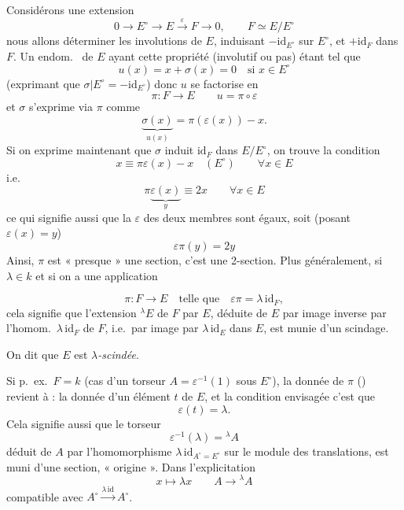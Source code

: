 \documentclass[11pt,a4paper]{article}
\begin{document}
Considérons une extension
\[
  0 \longrightarrow E^{\circ} \longrightarrow E \xrightarrow{\ \varepsilon\ } F \longrightarrow 0,
  \qquad F \simeq E/E^{\circ}
\]
nous allons déterminer les involutions de $E$, induisant $-\mathrm{id}_{E^{\circ}}$ sur $E^{\circ}$, et $+\mathrm{id}_F$ dans $F$. Un endom.\ \add{$\sigma$} de $E$ ayant cette propriété (involutif ou pas) étant tel que
\[
  u(x) = x + \sigma(x) = 0 \quad \text{si } x \in E^{\circ}
\]
(exprimant que $\sigma | E^{\circ} = -\mathrm{id}_{E^{\circ}}$) donc $u$ se factorise en
\[
  \pi : F \longrightarrow E \qquad u = \pi \circ \varepsilon
\]
et  $\sigma$ s'exprime via $\pi$ comme
\[
  \underbrace{\sigma(x)}_{u(x)} = \pi(\varepsilon(x)) - x .
\]
Si on exprime maintenant que $\sigma$ induit $\mathrm{id}_F$ dans $E/E^{\circ}$, on trouve la condition
\[
  x \equiv \pi \varepsilon(x) - x \quad (E^{\circ}) \qquad \forall x \in E
\]
i.e.
\[
  \pi \underbrace{\varepsilon(x)}_{y} \equiv 2x \qquad \forall x \in E
\]
ce qui signifie aussi que la $\varepsilon$ des deux membres sont égaux, soit (posant $\varepsilon(x) = y$)
\[
  \boxed{\varepsilon \pi(y) = 2y}
\]
Ainsi, $\pi$ est « presque » une section, c'est une 2-section.  Plus généralement, si $\lambda \in k$ et si on a une application

\[
  \pi : F \longrightarrow E \quad \text{telle que} \quad \varepsilon \pi = \lambda\, \mathrm{id}_F ,
\]
cela signifie que l'extension ${}^{\lambda}E$ de $F$ par $E$, déduite de $E$ par image inverse par l'homom.\ $\lambda\, \mathrm{id}_F$ de $F$, i.e.\ par image  par $\lambda\, \mathrm{id}_E$ dans $E$, est munie d'un scindage.

On dit que $E$ est \emph{$\lambda$-scindée}.

Si p.~ex.\ $F = k$ (cas d'un torseur $A = \varepsilon^{-1}(1)$ sous $E^{\circ}$), la donnée de $\pi$ () revient à : la donnée d'un élément $t$ de $E$, et la condition envisagée c'est que
\[
  \varepsilon(t) = \lambda .
\]
Cela signifie aussi que le torseur
\[
  \varepsilon^{-1}(\lambda) = {}^{\lambda}A
\]
 déduit de $A$ par l'homomorphisme $\lambda\, \mathrm{id}_{A^{\circ} = E^{\circ}}$ sur le module des translations, est muni d'une section, « origine ». Dans l'explicitation
\[
  x \longmapsto \lambda x \qquad A \longrightarrow {}^{\lambda}A
\]
compatible avec $A^{\circ} \xrightarrow{\lambda\,\mathrm{id}} A^{\circ}$.
\end{document}
